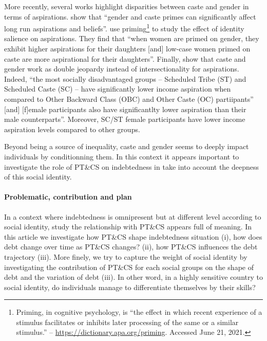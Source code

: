 \documentclass[a4paper, 11pt, onecolumn]{article}
\begin{document}
More recently, several works highlight disparities between caste and gender in terms of aspirations.
\cite{Mukherjee2017} show that ``gender and caste primes can significantly affect long run aspirations and beliefs''. 
\cite{Alvi2019} use priming\footnote{Priming, in cognitive psychology, is ``the effect in which recent experience of a stimulus facilitates or inhibits later processing of the same or a similar stimulus.'' -- \url{https://dictionary.apa.org/priming}. Accessed June 21, 2021.} to study the effect of identity salience on aspirations.
They find that ``when women are primed on gender, they exhibit higher aspirations for their daughters [and] low-case  women primed on caste are more aspirational for their daughters''.
Finally, \cite{Sarkar2020} show that caste and gender work as double jeopardy instead of intersectionality for aspirations.
Indeed, ``the most socially disadvantaged groups -- Scheduled Tribe (ST) and Scheduled Caste (SC) -- have significantly lower income aspiration when compared to Other Backward Class (OBC) and Other Caste (OC) partiipants'' [and] [f]emale participants also have significantlty lower aspiration than their male counterparts''.
Moreover, SC/ST female participants have lower income aspiration levels compared to other groups.

Beyond being a source of inequality, caste and gender seems to deeply impact individuals by conditionning them.
In this context it appears important to investigate the role of PT\&CS on indebtedness in take into account the deepness of this social identity.


\paragraph{Problematic, contribution and plan}
In a context where indebtedness is omnipresent but at different level according to social identity, study the relationship with PT\&CS appears full of meaning.
In this article we investigate how PT\&CS shape indebtedness situation (i), how does debt change over time as PT\&CS changes? (ii), how PT\&CS influences the debt trajectory (iii).
More finely, we try to capture the weight of social identity by investigating the contribution of PT\&CS for each social groups on the shape of debt and the variation of debt (iii).
In other word, in a highly sensitive country to social identity, do individuals manage to differentiate themselves by their skills?
\end{document}
